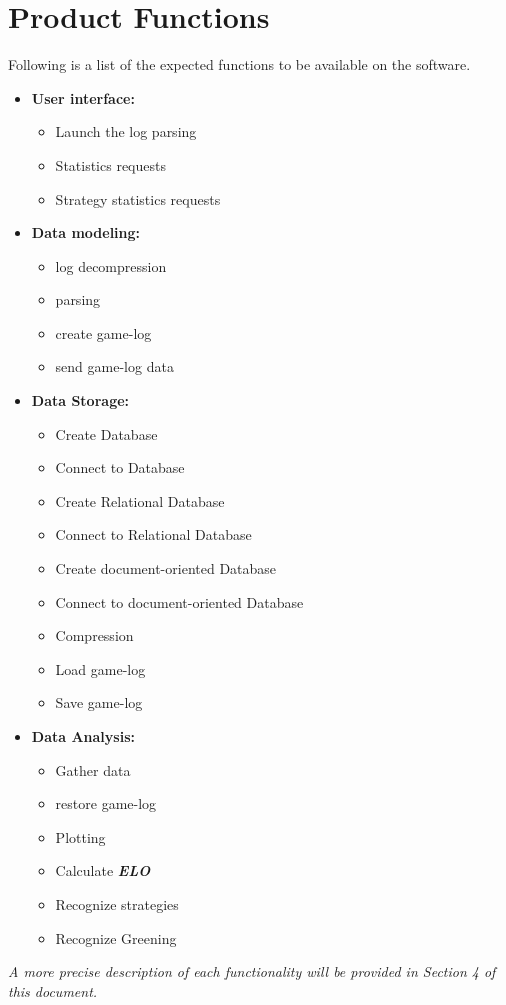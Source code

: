 \documentclass{scrreprt}
\begin{document}
\section{Product Functions}
Following is a list of the expected functions to be available on the software.
\begin{itemize}
\item{\textbf{User interface:}}
    \begin{itemize}
    \item{Launch the log parsing}
    \item{Statistics requests}
    \item{Strategy statistics requests}
    \end{itemize}
  \item{\textbf{Data modeling:}}
    \begin{itemize}
    \item{log decompression}
    \item{parsing}
    \item{create game-log}
    \item{send game-log data}
    \end{itemize}
  \item{\textbf{Data Storage:}}
    \begin{itemize}
    \item{Create Database}
    \item{Connect to Database}
    \item{Create Relational Database}
    \item{Connect to Relational Database}
    \item{Create document-oriented Database}
    \item{Connect to document-oriented Database}
    \item{Compression}
    \item{Load game-log}
    \item{Save game-log}
    \end{itemize}
  \item{\textbf{Data Analysis:}}
    \begin{itemize}
      \item{Gather data}
      \item{restore game-log}
      \item{Plotting}
      \item{Calculate \textit{\textbf{ELO}}}
      \item{Recognize strategies}
      \item{Recognize Greening}
    \end{itemize}
\end{itemize}
\textit{ A more precise description of each functionality will be provided in Section 4 of this document. }
\end{document}
